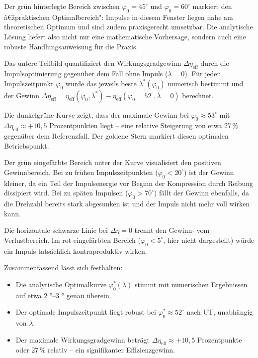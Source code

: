 ﻿\documentclass[a4paper,12pt]{article}
\begin{document}
Der grün hinterlegte Bereich zwischen $\varphi_0 = 45^\circ$ und
$\varphi_0 = 60^\circ$ markiert den â€žpraktischen Optimalbereich": Impulse
in diesem Fenster liegen nahe am theoretischen Optimum und sind zudem
praxisgerecht umsetzbar. Die analytische Lösung liefert also nicht nur eine
mathematische Vorhersage, sondern auch eine robuste Handlungsanweisung für
die Praxis.

Das untere Teilbild quantifiziert den Wirkungsgradgewinn $\Delta\eta_\text{eff}$
durch die Impulsoptimierung gegenüber dem Fall ohne Impuls ($\lambda = 0$).
Für jeden Impulszeitpunkt $\varphi_0$ wurde das jeweils beste $\lambda^*(\varphi_0)$
numerisch bestimmt und der Gewinn $\Delta\eta_\text{eff} = \eta_\text{eff}(\varphi_0, \lambda^*) - \eta_\text{eff}(\varphi_0=52^\circ, \lambda=0)$
berechnet.

Die dunkelgrüne Kurve zeigt, dass der maximale Gewinn bei $\varphi_0 \approx 53^\circ$
mit $\Delta\eta_\text{eff} \approx +10{,}5$ Prozentpunkten liegt -- eine
relative Steigerung von etwa 27\,\% gegenüber dem Referenzfall. Der goldene
Stern markiert diesen optimalen Betriebspunkt.

Der grün eingefärbte Bereich unter der Kurve visualisiert den positiven
Gewinnbereich. Bei zu frühen Impulszeitpunkten ($\varphi_0 < 20^\circ$)
ist der Gewinn kleiner, da ein Teil der Impulsenergie vor Beginn der
Kompression durch Reibung dissipiert wird. Bei zu späten Impulsen
($\varphi_0 > 70^\circ$) fällt der Gewinn ebenfalls, da die Drehzahl bereits
stark abgesunken ist und der Impuls nicht mehr voll wirken kann.

Die horizontale schwarze Linie bei $\Delta\eta = 0$ trennt den Gewinn- vom
Verlustbereich. Im rot eingefärbten Bereich ($\varphi_0 < 5^\circ$, hier
nicht dargestellt) würde ein Impuls tatsächlich kontraproduktiv wirken.

Zusammenfassend lässt sich festhalten:

\begin{itemize}
  \item Die analytische Optimalkurve $\varphi_0^*(\lambda)$ stimmt mit
    numerischen Ergebnissen auf etwa 2 °--3 ° genau überein.
  \item Der optimale Impulszeitpunkt liegt robust bei $\varphi_0^* \approx 52^\circ$
    nach UT, unabhängig von $\lambda$.
  \item Der maximale Wirkungsgradgewinn beträgt $\Delta\eta_\text{eff} \approx +10{,}5$
    Prozentpunkte oder 27\,\% relativ -- ein signifikanter Effizienzgewinn.
\end{itemize}
\end{document}
